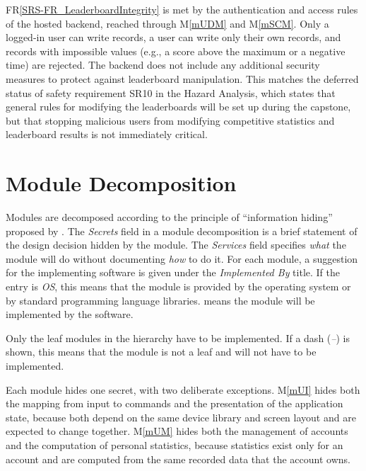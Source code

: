 \documentclass[12pt, titlepage]{article}
\newcommand{\rref}[1]{FR\ref{SRS-#1}}
\newcommand{\mref}[1]{M\ref{#1}}
\begin{document}
\rref{FR_LeaderboardIntegrity} is met by the authentication and access rules
of the hosted backend, reached through \mref{mUDM} and \mref{mSCM}. Only a
logged-in user can write records, a user can write only their own records,
and records with impossible values (e.g., a score above the maximum or a
negative time) are rejected. The backend does not include any additional security measures to protect against leaderboard manipulation.
This matches the deferred status of safety requirement SR10 in the Hazard
Analysis, which states that general rules for modifying the leaderboards will
be set up during the capstone, but that stopping malicious users from
modifying competitive statistics and leaderboard results is not immediately
critical.


\section{Module Decomposition} \label{SecMD}

Modules are decomposed according to the principle of ``information hiding''
proposed by \citet{ParnasEtAl1984}. The \emph{Secrets} field in a module
decomposition is a brief statement of the design decision hidden by the
module. The \emph{Services} field specifies \emph{what} the module will do
without documenting \emph{how} to do it. For each module, a suggestion for the
implementing software is given under the \emph{Implemented By} title. If the
entry is \emph{OS}, this means that the module is provided by the operating
system or by standard programming language libraries.  \emph{\progname{}} means the
module will be implemented by the \progname{} software.

Only the leaf modules in the hierarchy have to be implemented. If a dash
(\emph{--}) is shown, this means that the module is not a leaf and will not have
to be implemented.

Each module hides one secret, with two deliberate exceptions. \mref{mUI}
hides both the mapping from input to commands and the presentation of the
application state, because both depend on the same device library and screen
layout and are expected to change together. \mref{mUM} hides both the
management of accounts and the computation of personal statistics, because
statistics exist only for an account and are computed from the same recorded
data that the account owns.
\end{document}
